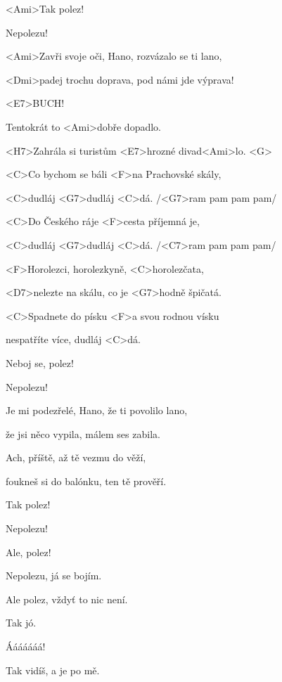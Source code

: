 

<Ami>Tak polez!

Nepolezu!

\zs
<Ami>Zavři svoje oči, Hano, rozvázalo se ti lano,

<Dmi>padej trochu doprava, pod námi jde výprava!

<E7>BUCH!

Tentokrát to <Ami>dobře dopadlo.

<H7>Zahrála si turistům <E7>hrozné divad<Ami>lo. <G>
\ks

\zr
<C>Co bychom se báli <F>na Prachovské skály,

<C>dudláj <G7>dudláj <C>dá. /<G7>ram pam pam pam/

<C>Do Českého ráje <F>cesta příjemná je,

<C>dudláj <G7>dudláj <C>dá. /<C7>ram pam pam pam/

<F>Horolezci, horolezkyně, <C>horolezčata,

<D7>nelezte na skálu, co je <G7>hodně špičatá.

<C>Spadnete do písku <F>a svou rodnou vísku

nespatříte více, dudláj <C>dá.
\kr

Neboj se, polez!

Nepolezu!

\zs
Je mi podezřelé, Hano, že ti povolilo lano,

že jsi něco vypila, málem ses zabila.

Ach, příště, až tě vezmu do věží,

foukneš si do balónku, ten tě prověří.
\ks

\zr \kr

Tak polez!

Nepolezu!

Ale, polez!

Nepolezu, já se bojím.

Ale polez, vždyť to nic není.

Tak jó.

Ááááááá!

Tak vidíš, a je po mě.

\kp
